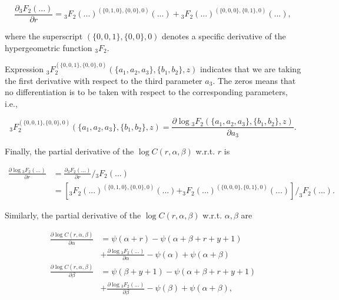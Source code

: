 \documentclass[11pt]{article}
\begin{document}
\begin{equation}
	\frac{\partial {}_3F_2(...)}{\partial r} = {}_3F_2(...)^{(\{0,1,0\},\{0,0\},0)}(...) + {}_3F_2(...)^{(\{0,0,0\},\{0,1\},0)}(...),
\end{equation}

where the superscript \( (\{0,0,1\},\{0,0\},0) \) denotes a specific derivative of the  hypergeometric function \( {}_3F_2 \).

Expression \( {}_3F_2^{(\{0,0,1\},\{0,0\},0)}(\{a_1,a_2,a_3\},\{b_1,b_2\},z) \) indicates that we are taking the first derivative with respect to the third parameter \( a_3 \). The zeros means that no differentiation is to be taken with respect to the corresponding parameters, i.e.,

\begin{equation}
	{}_3F_2^{(\{0,0,1\},\{0,0\},0)}(\{a_1,a_2,a_3\},\{b_1,b_2\},z) = \frac{\partial \log {}_3F_2(\{a_1,a_2,a_3\},\{b_1,b_2\},z)}{\partial a_3}.
\end{equation}

Finally, the partial derivative of the $\log C(r,\alpha,\beta)$ w.r.t. $r$ is

\begin{equation}
\begin{aligned}
	\frac{\partial \log {}_3F_2(...)}{\partial r} &=  \frac{\partial {}_3F_2(...)}{\partial r} /  {}_3F_2(...) \\
	&= \left[ _3F_2(...)^{(\{0,1,0\},\{0,0\},0)}(...) + _3F_2(...)^{(\{0,0,0\},\{0,1\},0)}(...) \right]  / _3F_2(...).
\end{aligned}
\end{equation}




Similarly, the partial derivative of the $\log C(r,\alpha,\beta)$ w.r.t. $\alpha, \beta$ are

\begin{equation}
  \begin{aligned}
\frac{\partial \log C(r,\alpha,\beta)}{\partial \alpha} &= \psi(\alpha+r) - \psi(\alpha+\beta+r+y+1)  \\
&+ \frac{\partial \log {}_3F_2(...)}{\partial \alpha} - \psi(\alpha) + \psi(\alpha+\beta) \\
\frac{\partial \log C(r,\alpha,\beta)}{\partial \beta} &= \psi(\beta+y+1) - \psi(\alpha+\beta+r+y+1)  \\
&+ \frac{\partial \log {}_3F_2(...)}{\partial \beta} - \psi(\beta) + \psi(\alpha+\beta),
  \end{aligned}
\end{equation}
\end{document}
